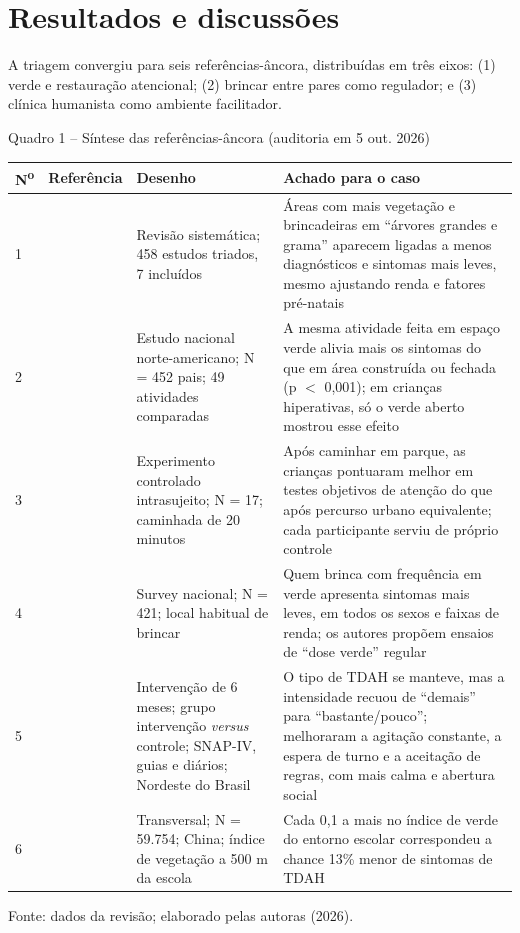 \section{Resultados e discuss\~oes}

A triagem convergiu para seis refer\^encias-\^ancora, distribu\'idas em tr\^es eixos: (1) verde e restaura\c{c}\~ao atencional; (2) brincar entre pares como regulador; e (3) cl\'inica humanista como ambiente facilitador.

\begin{quadro}{Quadro 1 -- S\'intese das refer\^encias-\^ancora (auditoria em 5 out. 2026)}
\renewcommand{\arraystretch}{1.25}
\begin{tabular}{p{0.8cm} p{4.2cm} p{4.2cm} p{4.6cm}}
\toprule
\textbf{N\textsuperscript{o}} & \textbf{Refer\^encia} & \textbf{Desenho} & \textbf{Achado para o caso} \\
\midrule
1 & \cite{hood2024} & Revis\~ao sistem\'atica; 458 estudos triados, 7 inclu\'idos & \'Areas com mais vegeta\c{c}\~ao e brincadeiras em ``\'arvores grandes e grama'' aparecem ligadas a menos diagn\'osticos e sintomas mais leves, mesmo ajustando renda e fatores pr\'e-natais \\
2 & \cite{kuo2004} & Estudo nacional norte-americano; N = 452 pais; 49 atividades comparadas & A mesma atividade feita em espa\c{c}o verde alivia mais os sintomas do que em \'area constru\'ida ou fechada (p $<$ 0,001); em crian\c{c}as hiperativas, s\'o o verde aberto mostrou esse efeito \\
3 & \cite{fabertaylor2009} & Experimento controlado intrasujeito; N = 17; caminhada de 20 minutos & Ap\'os caminhar em parque, as crian\c{c}as pontuaram melhor em testes objetivos de aten\c{c}\~ao do que ap\'os percurso urbano equivalente; cada participante serviu de pr\'oprio controle \\
4 & \cite{taylor2011} & Survey nacional; N = 421; local habitual de brincar & Quem brinca com frequ\^encia em verde apresenta sintomas mais leves, em todos os sexos e faixas de renda; os autores prop\~oem ensaios de ``dose verde'' regular \\
5 & \cite{damasceno2025} & Interven\c{c}\~ao de 6 meses; grupo interven\c{c}\~ao \textit{versus} controle; SNAP-IV, guias e di\'arios; Nordeste do Brasil & O tipo de TDAH se manteve, mas a intensidade recuou de ``demais'' para ``bastante/pouco''; melhoraram a agita\c{c}\~ao constante, a espera de turno e a aceita\c{c}\~ao de regras, com mais calma e abertura social \\
6 & \cite{yang2019} & Transversal; N = 59.754; China; \'indice de vegeta\c{c}\~ao a 500 m da escola & Cada 0,1 a mais no \'indice de verde do entorno escolar correspondeu a chance 13\% menor de sintomas de TDAH \\
\bottomrule
\end{tabular}
\par\smallskip
{Fonte: dados da revis\~ao; elaborado pelas autoras (2026).}
\end{quadro}

